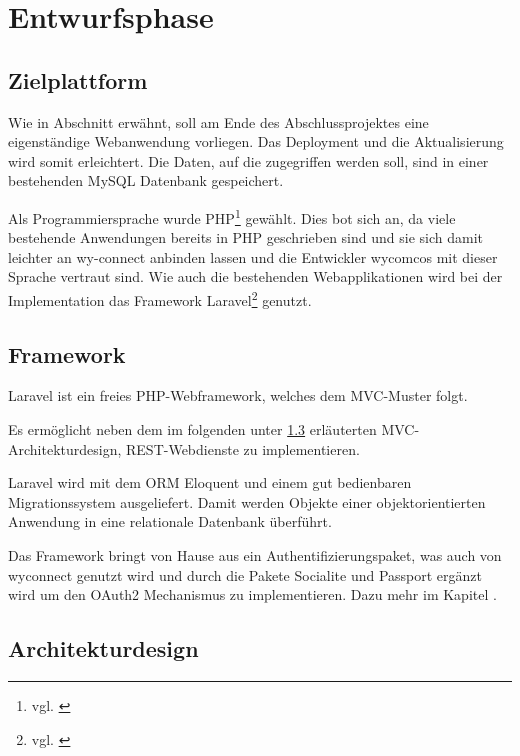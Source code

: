 \section{Entwurfsphase} 
\label{sec:Entwurfsphase}

\subsection{Zielplattform}
\label{sec:Zielplattform}

Wie in Abschnitt  erwähnt, soll am Ende des Abschlussprojektes eine eigenständige Webanwendung vorliegen. Das Deployment und die Aktualisierung wird somit erleichtert.
Die Daten, auf die zugegriffen werden soll, sind in einer bestehenden MySQL Datenbank gespeichert. 

Als Programmiersprache wurde \acs{PHP}\footnote{vgl. \cite{PHP}} gewählt. Dies bot sich an, da viele bestehende Anwendungen bereits in PHP geschrieben sind und sie sich damit leichter an wy-connect anbinden lassen und die Entwickler wycomcos mit dieser Sprache vertraut sind. 
Wie auch die bestehenden Webapplikationen wird bei der Implementation das Framework Laravel\footnote{vgl. \cite{Laravel}} genutzt.

\subsection{Framework}
\label{sec:Framework}

Laravel ist ein freies \acs{PHP}-Webframework, welches dem \acs{MVC}-Muster folgt. 

Es ermöglicht neben dem im folgenden unter \ref{sec:Architekturdesign} erläuterten MVC-Architekturdesign, \acs{REST}-Webdienste zu implementieren.

Laravel wird mit dem \acs{ORM} Eloquent und einem gut bedienbaren Migrationssystem ausgeliefert. Damit werden Objekte einer objektorientierten Anwendung in eine relationale Datenbank überführt.

Das Framework bringt von Hause aus ein Authentifizierungspaket, was auch von wyconnect genutzt wird und durch die Pakete Socialite und Passport ergänzt wird um den OAuth2 Mechanismus zu implementieren. Dazu mehr im Kapitel .

\subsection{Architekturdesign}
\label{sec:Architekturdesign}

